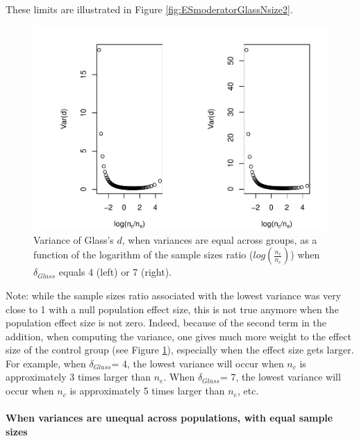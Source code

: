 \documentclass[
  english,
  man,mask]{apa6}
\let\oldparagraph\paragraph
\renewcommand{\paragraph}[1]{\oldparagraph{#1}\mbox{}}
\begin{document}
These limits are illustrated in Figure \ref{fig:ESmoderatorGlassNsize2}.

\begin{figure}
\centering
\includegraphics{SupMat1_files/figure-latex/varglasshomNratiobis2-1.pdf}
\caption{\label{fig:varglasshomNratiobis2}Variance of Glass's \(d\), when variances are equal across groups, as a function of the logarithm of the sample sizes ratio (\(log\left(\frac{n_c}{n_e} \right)\)) when \(\delta_{Glass}\) equals 4 (left) or 7 (right).}
\end{figure}

Note: while the sample sizes ratio associated with the lowest variance was very close to 1 with a null population effect size, this is not true anymore when the population effect size is not zero. Indeed, because of the second term in the addition, when computing the variance, one gives much more weight to the effect size of the control group (see Figure \ref{fig:varglasshomNratiobis2}), especially when the effect size gets larger. For example, when \(\delta_{Glass}\)= 4, the lowest variance will occur when \(n_c\) is approximately 3 times larger than \(n_e\). When \(\delta_{Glass}\)= 7, the lowest variance will occur when \(n_c\) is approximately 5 times larger than \(n_e\), etc.

\hypertarget{when-variances-are-unequal-across-populations-with-equal-sample-sizes-2}{%
\paragraph{When variances are unequal across populations, with equal sample sizes}\label{when-variances-are-unequal-across-populations-with-equal-sample-sizes-2}}
\end{document}
